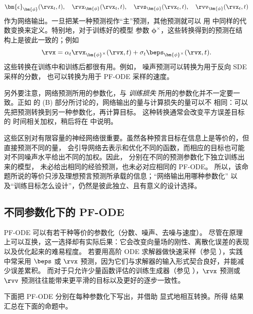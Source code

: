 \[
\bm{\epsilon}_{\bm{\phi}}(\rvx_t,t),
\quad
\rvx_{\bm{\phi}}(\rvx_t,t),
\quad
\rvs_{\bm{\phi}}(\rvx_t,t),
\quad
\rvv_{\bm{\phi}}(\rvx_t,t)
\]
作为网络输出。一旦把某一种预测视作“主”预测，其他预测就可以
用  中同样的代数变换来定义。特别地，对于训练好的模型
参数 $\bm{\phi}^\times$，这些转换得到的预测在结构上是彼此一致的；例如
\[
\rvx
=
\alpha_t
\rvx_{\bm{\phi}^\times}(\rvx,t)
+
\sigma_t
\beps_{\bm{\phi}^\times}(\rvx,t).
\]
这些转换在训练中和训练后都很有用。例如，
噪声预测可以转换为用于反向 SDE 采样的分数，
也可以转换为用于 PF-ODE 采样的速度。

另外要注意，网络预测所用的参数化，与
\emph{训练损失} 所用的参数化并不一定要一致。正如  的 (B) 部分所讨论的，网络输出的量与计算损失的量可以不
相同：可以先把预测转换到另一种参数化，再计算目标。
这种转换通常会改变平方误差目标的
时间相关加权，稍后将在  中说明。

这些区别对有限容量的神经网络很重要。虽然各种预言目标在信息上是等价的，但直接预测不同的量，
会引导网络去表示和优化不同的函数，而相应的目标也可能对不同噪声水平给出不同的加权。因此，
分别在不同的预测参数化下独立训练出来的模型，
未必给出相同的经验预测，也未必对应相同的 PF-ODE。
所以，该命题所说的等价只涉及理想预言预测所承载的信息；“网络输出用哪种参数化”
以及“训练目标怎么设计”，仍然是彼此独立、且有意义的设计选择。


\subsection{不同参数化下的 PF-ODE}\label{subsec:pf-ode-different-para}
PF-ODE 可以有若干种等价的参数化（分数、噪声、去噪与速度）。
尽管在原理上可以互换，这一选择却有实际后果：它会改变向量场的刚性、离散化误差的表现以及优化起来的难易程度。
若要用高阶 ODE 求解器做快速采样（参见 ），实践中常采用 $\beps$ 或 $\rvx$ 预测，因为它们与求解器的输入形式契合良好，并能减少误差累积。
而对于只允许少量函数评估的训练生成器（参见 ），$\rvx$ 预测或 $\rvv$ 预测往往能带来更平滑的目标以及更好的逐步一致性。


下面把 PF-ODE 分别在每种参数化下写出，并借助
 显式地相互转换。所得
结果汇总在下面的命题中。


